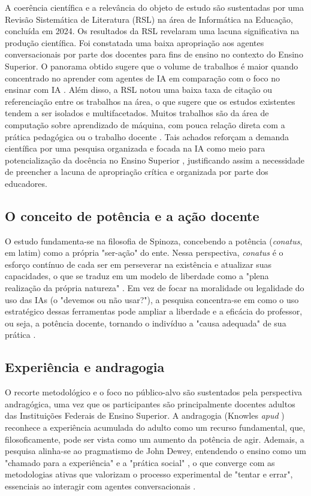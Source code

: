 \documentclass[portuguese]{textolivre}
\begin{document}
A coerência científica e a relevância do objeto de estudo são sustentadas por uma Revisão Sistemática de Literatura (RSL) na área de Informática na Educação, concluída em 2024. Os resultados da RSL revelaram uma lacuna significativa na produção científica. Foi constatada uma baixa apropriação aos agentes conversacionais por parte dos docentes para fins de ensino no contexto do Ensino Superior. O panorama obtido sugere que o volume de trabalhos é maior quando concentrado no aprender com agentes de IA em comparação com o foco no ensinar com IA \cite{silveira2019uso}. Além disso, a RSL notou uma baixa taxa de citação ou referenciação entre os trabalhos na área, o que sugere que os estudos existentes tendem a ser isolados e multifacetados. Muitos trabalhos são da área de computação sobre aprendizado de máquina, com pouca relação direta com a prática pedagógica ou o trabalho docente \cite{zhai2021review}. Tais achados reforçam a demanda científica por uma pesquisa organizada e focada na IA como meio para potencialização da docência no Ensino Superior \cite{guimaraes2023metodologias}, justificando assim a necessidade de preencher a lacuna de apropriação crítica e organizada por parte dos educadores.

\subsection{O conceito de potência e a ação docente}\label{sec-conduta}
O estudo fundamenta-se na filosofia de Spinoza, concebendo a potência (\textit{conatus}, em latim) como a própria "ser-ação" do ente. Nessa perspectiva, \textit{conatus} é o esforço contínuo de cada ser em perseverar na existência e atualizar suas capacidades, o que se traduz em um modelo de liberdade como a "plena realização da própria natureza" \cite{spinoza2007etica}. Em vez de focar na moralidade ou legalidade do uso das IAs (o "devemos ou não usar?"), a pesquisa concentra-se em como o uso estratégico dessas ferramentas pode ampliar a liberdade e a eficácia do professor, ou seja, a potência docente, tornando o indivíduo a "causa adequada" de sua prática \cite{barros2018revisitando,spinoza2007etica}.


\subsection{Experiência e andragogia}\label{sec-fmt-manuscrito}
O recorte metodológico e o foco no público-alvo são sustentados pela perspectiva andragógica, uma vez que os participantes são principalmente docentes adultos das Instituições Federais de Ensino Superior. A andragogia (Knowles \textit{apud} \textcite{barros2018revisitando}) reconhece a experiência acumulada do adulto como um recurso fundamental, que, filosoficamente, pode ser vista como um aumento da potência de agir. Ademais, a pesquisa alinha-se ao pragmatismo de John Dewey, entendendo o ensino como um "chamado para a experiência" e a "prática social" \cite{dewey1959democracia,dewey1979experiencia}, o que converge com as metodologias ativas que valorizam o processo experimental de "tentar e errar", essenciais ao interagir com agentes conversacionais \cite{bacich2018metodologias}.
\end{document}
